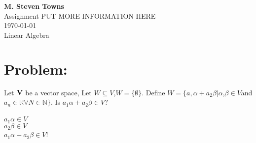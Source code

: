 \documentclass{report}
\begin{document}
\begin{center}
	\textbf{M. Steven Towns}\\
	Assignment PUT MORE INFORMATION HERE\\
	\today\\
	Linear Algebra\\
\end{center}

\hrulefill
\section*{Problem:}
Let $\bold{V}$ be a vector space, Let $W \subseteq V$,$W =\{\emptyset\}$. 
Define 
$W=\{a,\alpha+a_2\beta | \alpha$,$\beta\in V$and $a_n\in\mathbb{R}\forall N \in\mathbb{N}\}$. 
\newline
Is $a_1\alpha+a_2\beta\in V$?\\\\
$a_1\alpha\in V$\\
$a_2\beta\in V$\\
$a_1\alpha+ a_2\beta\in V$!
\end{document}
